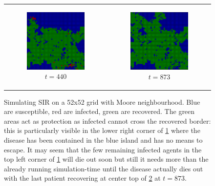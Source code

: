 \begin{figure}
\begin{center}
\begin{tabular}{c c}
		\begin{subfigure}[b]{0.4\textwidth}
			\centering
			\includegraphics[width=.6\textwidth, angle=0]{./../shared/fig/spatial/SIR_spatial_52x52_440time.png}
			\caption{$t = 440$}
			\label{fig:sir_spatial_440}
		\end{subfigure}
		
		& 
		
		\begin{subfigure}[b]{0.4\textwidth}
			\centering
			\includegraphics[width=.6\textwidth, angle=0]{./../shared/fig/spatial/SIR_spatial_52x52_873time.png}
			\caption{$t = 873$}
			\label{fig:sir_spatial_873}
		\end{subfigure}
	\end{tabular}
	
	\caption{Simulating SIR on a 52x52 grid with Moore neighbourhood. Blue are susceptible, red are infected, green are recovered. The green areas act as protection as infected cannot cross the recovered border: this is particularly visible in the lower right corner of \ref{fig:sir_spatial_440} where the disease has been contained in the blue island and has no means to escape. It may seem that the few remaining infected agents in the top left corner of \ref{fig:sir_spatial_440} will die out soon but still it needs more than the already running simulation-time until the disease actually dies out with the last patient recovering at center top of \ref{fig:sir_spatial_873} at $t = 873$.} 
	\label{fig:sir_spatial}
\end{center}
\end{figure}

